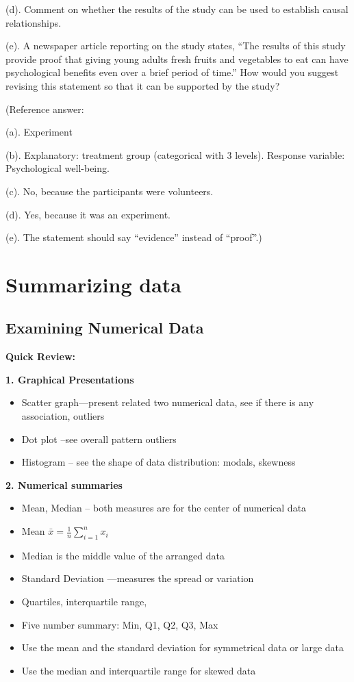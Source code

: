 \documentclass[
]{book}
\providecommand{\tightlist}{%
  \setlength{\itemsep}{0pt}\setlength{\parskip}{0pt}}
\begin{document}
(d). Comment on whether the results of the study can be used to establish causal relationships.

(e). A newspaper article reporting on the study states, ``The results of this study provide proof that giving young adults fresh fruits and vegetables to eat can have psychological benefits even over a brief period of time.'' How would you suggest revising this statement so that it can be supported by the study?

(Reference answer:

(a). Experiment

(b). Explanatory: treatment group (categorical with 3 levels). Response variable: Psychological well-being.

(c). No, because the participants were volunteers.

(d). Yes, because it was an experiment.

(e). The statement should say ``evidence'' instead of ``proof''.)

\chapter{Summarizing data}\label{summarizing-data}

\section{Examining Numerical Data}\label{examining-numerical-data}

\textbf{Quick Review:}

\textbf{1. Graphical Presentations}

\begin{itemize}
\tightlist
\item
  Scatter graph---present related two numerical data, see if there is any association, outliers
\item
  Dot plot --see overall pattern outliers
\item
  Histogram -- see the shape of data distribution: modals, skewness
\end{itemize}

\textbf{2. Numerical summaries}

\begin{itemize}
\tightlist
\item
  Mean, Median -- both measures are for the center of numerical data
\item
  Mean \(\bar{x} = \frac{1}{n} \sum_{i=1}^{n} x_i\)\\
\item
  Median is the middle value of the arranged data
\item
  Standard Deviation ---measures the spread or variation
\item
  Quartiles, interquartile range,
\item
  Five number summary: Min, Q1, Q2, Q3, Max
\item
  Use the mean and the standard deviation for symmetrical data or large data
\item
  Use the median and interquartile range for skewed data
\end{itemize}
\end{document}
